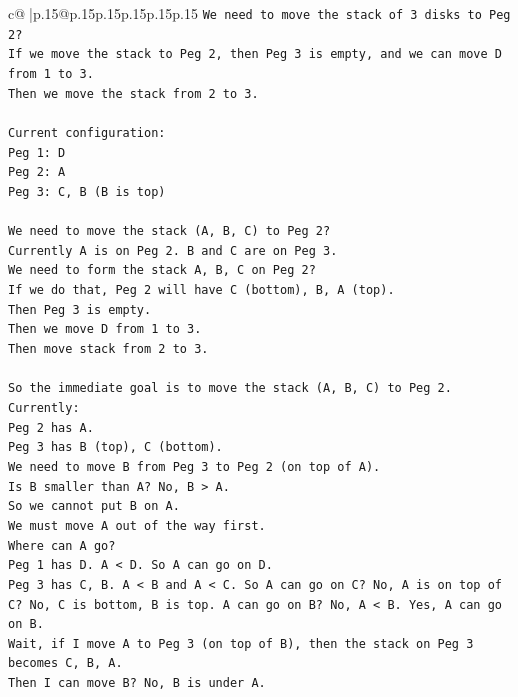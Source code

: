 \documentclass{article}
\begin{document}
{\begin{supertabular}{c@{$\;$}|p{.15\linewidth}@{}p{.15\linewidth}p{.15\linewidth}p{.15\linewidth}p{.15\linewidth}p{.15\linewidth}}
{{{\texttt{We need to move the stack of 3 disks to Peg 2?} \\
\texttt{If we move the stack to Peg 2, then Peg 3 is empty, and we can move D from 1 to 3.} \\
\texttt{Then we move the stack from 2 to 3.} \\
\\ 
\texttt{Current configuration:} \\
\texttt{Peg 1: D} \\
\texttt{Peg 2: A} \\
\texttt{Peg 3: C, B (B is top)} \\
\\ 
\texttt{We need to move the stack (A, B, C) to Peg 2?} \\
\texttt{Currently A is on Peg 2. B and C are on Peg 3.} \\
\texttt{We need to form the stack A, B, C on Peg 2?} \\
\texttt{If we do that, Peg 2 will have C (bottom), B, A (top).} \\
\texttt{Then Peg 3 is empty.} \\
\texttt{Then we move D from 1 to 3.} \\
\texttt{Then move stack from 2 to 3.} \\
\\ 
\texttt{So the immediate goal is to move the stack (A, B, C) to Peg 2.} \\
\texttt{Currently:} \\
\texttt{Peg 2 has A.} \\
\texttt{Peg 3 has B (top), C (bottom).} \\
\texttt{We need to move B from Peg 3 to Peg 2 (on top of A).} \\
\texttt{Is B smaller than A? No, B > A.} \\
\texttt{So we cannot put B on A.} \\
\texttt{We must move A out of the way first.} \\
\texttt{Where can A go?} \\
\texttt{Peg 1 has D. A < D. So A can go on D.} \\
\texttt{Peg 3 has C, B. A < B and A < C. So A can go on C? No, A is on top of C? No, C is bottom, B is top. A can go on B? No, A < B. Yes, A can go on B.} \\
\texttt{Wait, if I move A to Peg 3 (on top of B), then the stack on Peg 3 becomes C, B, A.} \\
\texttt{Then I can move B? No, B is under A.} \\
}}}
\end{supertabular}}
\end{document}
